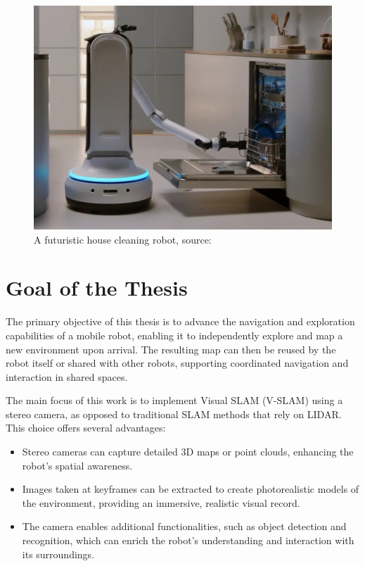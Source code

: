 \FloatBarrier
\begin{figure}[htbp]
	\centering
	\includegraphics[width=150mm, keepaspectratio]{figures_jpg/samsung-bot-handy.jpg}
	\caption{A futuristic house cleaning robot, source:~\cite{futuristic_household_robot}}
	\label{fig:futuristic_house_cleaning_robot}
\end{figure}
\FloatBarrier

\section{Goal of the Thesis}

The primary objective of this thesis is to advance the navigation and exploration capabilities of a mobile robot, enabling it to independently explore and map a new environment upon arrival. The resulting map can then be reused by the robot itself or shared with other robots, supporting coordinated navigation and interaction in shared spaces.

The main focus of this work is to implement Visual SLAM (V-SLAM) using a stereo camera, as opposed to traditional SLAM methods that rely on LIDAR. This choice offers several advantages:
\begin{itemize}
\setlength\itemsep{0em}
    \item Stereo cameras can capture detailed 3D maps or point clouds, enhancing the robot's spatial awareness.
    \item Images taken at keyframes can be extracted to create photorealistic models of the environment, providing an immersive, realistic visual record.
    \item The camera enables additional functionalities, such as object detection and recognition, which can enrich the robot's understanding and interaction with its surroundings.
\end{itemize}

